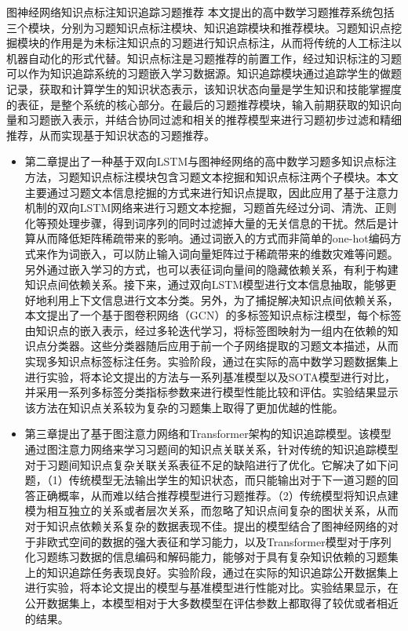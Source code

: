 \begin{abstractC}{图神经网络}{知识点标注}{知识追踪}{习题推荐}{}
    本文提出的高中数学习题推荐系统包括三个模块，分别为习题知识点标注模块、知识追踪模块和推荐模块。习题知识点挖掘模块的作用是为未标注知识点的习题进行知识点标注，从而将传统的人工标注以机器自动化的形式代替。知识点标注是习题推荐的前置工作，经过知识标注的习题可以作为知识追踪系统的习题嵌入学习数据源。知识追踪模块通过追踪学生的做题记录，获取和计算学生的知识状态表示，该知识状态向量是学生知识和技能掌握度的表征，是整个系统的核心部分。在最后的习题推荐模块，输入前期获取的知识向量和习题嵌入表示，并结合协同过滤和相关的推荐模型来进行习题初步过滤和精细推荐，从而实现基于知识状态的习题推荐。
    \begin{itemize}
        \item 第二章提出了一种基于双向LSTM与图神经网络的高中数学习题多知识点标注方法，习题知识点标注模块包含习题文本挖掘和知识点标注两个子模块。本文主要通过习题文本信息挖掘的方式来进行知识点提取，因此应用了基于注意力机制的双向LSTM网络来进行习题文本挖掘，习题首先经过分词、清洗、正则化等预处理步骤，得到词序列的同时过滤掉大量的无关信息的干扰。然后是计算从而降低矩阵稀疏带来的影响。通过词嵌入的方式而非简单的one-hot编码方式来作为词嵌入，可以防止输入词向量矩阵过于稀疏带来的维数灾难等问题。另外通过嵌入学习的方式，也可以表征词向量间的隐藏依赖关系，有利于构建知识点间依赖关系。接下来，通过双向LSTM模型进行文本信息抽取，能够更好地利用上下文信息进行文本分类。另外，为了捕捉解决知识点间依赖关系，本文提出了一个基于图卷积网络（GCN）的多标签知识点标注模型，每个标签由知识点的嵌入表示，经过多轮迭代学习，将标签图映射为一组内在依赖的知识点分类器。这些分类器随后应用于前一个子网络提取的习题文本描述，从而实现多知识点标签标注任务。实验阶段，通过在实际的高中数学习题数据集上进行实验，将本论文提出的方法与一系列基准模型以及SOTA模型进行对比，并采用一系列多标签分类指标参数来进行模型性能比较和评估。实验结果显示该方法在知识点关系较为复杂的习题集上取得了更加优越的性能。
        \item 第三章提出了基于图注意力网络和Transformer架构的知识追踪模型。该模型通过图注意力网络来学习习题间的知识点关联关系，针对传统的知识追踪模型对于习题间知识点复杂关联关系表征不足的缺陷进行了优化。它解决了如下问题，（1）传统模型无法输出学生的知识状态，而只能输出对于下一道习题的回答正确概率，从而难以结合推荐模型进行习题推荐。（2）传统模型将知识点建模为相互独立的关系或者层次关系，而忽略了知识点间复杂的图状关系，从而对于知识点依赖关系复杂的数据表现不佳。提出的模型结合了图神经网络的对于非欧式空间的数据的强大表征和学习能力，以及Transformer模型对于序列化习题练习数据的信息编码和解码能力，能够对于具有复杂知识依赖的习题集上的知识追踪任务表现良好。实验阶段，通过在实际的知识追踪公开数据集上进行实验，将本论文提出的模型与基准模型进行性能对比。实验结果显示，在公开数据集上，本模型相对于大多数模型在评估参数上都取得了较优或者相近的结果。

\end{itemize}
\end{abstractC}
